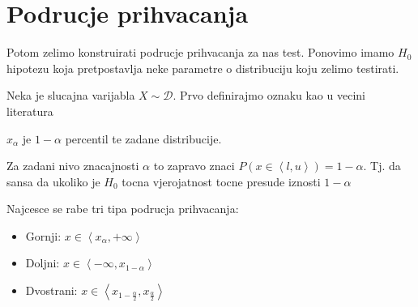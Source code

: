 \section{Podrucje prihvacanja}

Potom zelimo konstruirati podrucje prihvacanja za nas test. \cite{vis3} Ponovimo imamo $H_0$ hipotezu koja pretpostavlja neke parametre o distribuciju koju zelimo testirati. 

Neka je slucajna varijabla $X \sim \mathcal{D}$. 
Prvo definirajmo oznaku kao u vecini literatura \cite{vis3} \cite{engstat} 

$x_\alpha$ je $1-\alpha$ percentil te zadane distribucije.

Za zadani nivo znacajnosti $\alpha$ to zapravo znaci  $P(x \in \left<l, u\right>) = 1-\alpha$. Tj. da sansa da ukoliko je $H_0$ tocna vjerojatnost tocne presude iznosti $1-\alpha$

Najcesce se rabe tri tipa podrucja prihvacanja:
\begin{itemize}
	\item Gornji: $x \in \left< x_\alpha, +\infty \right>$
	\item Doljni: $x \in \left<-\infty, x_{1-\alpha} \right>$
	\item Dvostrani: $x \in \left<x_{1-\frac{\alpha}{2}}, x_{\frac{\alpha}{2}} \right>$
\end{itemize}